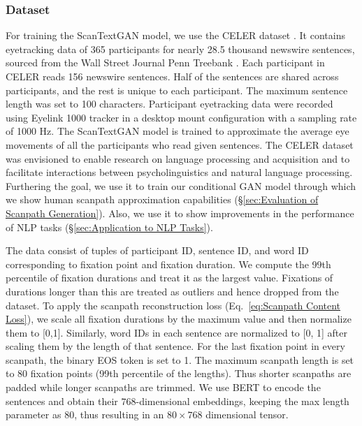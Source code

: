 \subsubsection{Dataset} 
\label{sec:dataset}
 For training the ScanTextGAN model, we use the CELER dataset \cite{berzak2022celer}. It contains eyetracking data of 365 participants for nearly 28.5 thousand newswire sentences, sourced from the Wall Street Journal Penn Treebank \cite{marcinkiewicz1994building}. Each participant in CELER reads 156 newswire sentences. Half of the sentences are shared across participants, and the rest is unique to each participant. The maximum sentence length was set to 100 characters. Participant eyetracking data were recorded using Eyelink 1000 tracker in a desktop mount configuration with a sampling rate of 1000 Hz. The ScanTextGAN model is trained to approximate the average eye movements of all the participants who read given sentences. The CELER dataset was envisioned to enable research on language processing and acquisition and to facilitate interactions between psycholinguistics and natural language processing. Furthering the goal, we use it to train our conditional GAN model through which we show human scanpath approximation capabilities (\S\ref{sec:Evaluation of Scanpath Generation}). Also, we use it to show improvements in the performance of NLP tasks (\S\ref{sec:Application to NLP Tasks}). 

The data consist of tuples of participant ID, sentence ID, and word ID corresponding to fixation point and fixation duration. We compute the 99th percentile of fixation durations and treat it as the largest value. Fixations of durations longer than this are treated as outliers and hence dropped from the dataset. To apply the scanpath reconstruction loss (Eq.~\ref{eq:Scanpath Content Loss}), we scale all fixation durations by the maximum value and then normalize them to [0,1]. Similarly, word IDs in each sentence are normalized to [0, 1] after scaling them by the length of that sentence. For the last fixation point in every scanpath, the binary EOS token is set to 1. The maximum scanpath length is set to 80 fixation points (99th percentile of the lengths). Thus shorter scanpaths are padded while longer scanpaths are trimmed. We use BERT to encode the sentences and obtain their $768$-dimensional embeddings, keeping the max length parameter as 80, thus resulting in an $80\times768$ dimensional tensor.

